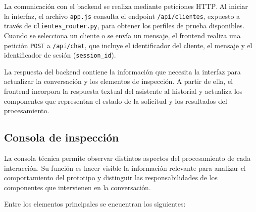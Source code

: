 \documentclass[12pt,a4paper]{report}
\begin{document}
La comunicación con el backend se realiza mediante peticiones HTTP. Al iniciar la interfaz, el archivo \texttt{app.js} consulta el endpoint \texttt{/api/clientes}, expuesto a través de \texttt{clientes\_router.py}, para obtener los perfiles de prueba disponibles. Cuando se selecciona un cliente o se envía un mensaje, el frontend realiza una petición \texttt{POST} a \texttt{/api/chat}, que incluye el identificador del cliente, el mensaje y el identificador de sesión (\texttt{session\_id}).

La respuesta del backend contiene la información que necesita la interfaz para actualizar la conversación y los elementos de inspección. A partir de ella, el frontend incorpora la respuesta textual del asistente al historial y actualiza los componentes que representan el estado de la solicitud y los resultados del procesamiento.

\subsection{Consola de inspección}

La consola técnica permite observar distintos aspectos del procesamiento de cada interacción. Su función es hacer visible la información relevante para analizar el comportamiento del prototipo y distinguir las responsabilidades de los componentes que intervienen en la conversación.

Entre los elementos principales se encuentran los siguientes:
\end{document}
